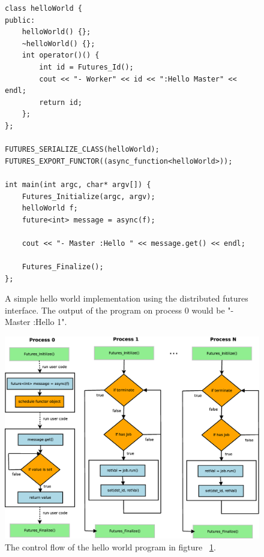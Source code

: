 \begin{figure}[here]
\begin{lstlisting}
class helloWorld {
public:
	helloWorld() {};
	~helloWorld() {};
	int operator()() { 
		int id = Futures_Id();
		cout << "- Worker" << id << ":Hello Master" << endl;
		return id;
	};
};

FUTURES_SERIALIZE_CLASS(helloWorld);
FUTURES_EXPORT_FUNCTOR((async_function<helloWorld>));

int main(int argc, char* argv[]) {
	Futures_Initialize(argc, argv);
	helloWorld f;
	future<int> message = async(f);

	cout << "- Master :Hello " << message.get() << endl;

	Futures_Finalize();
};
\end{lstlisting}
\caption{
A simple hello world implementation using the distributed futures interface.  
The output of the program on process 0 would be "- Master :Hello 1".}
\label{lst:hello}
\end{figure}

\begin{figure}[here]
\includegraphics[width=\columnwidth]{figures/hello_flow}
\caption{
The control flow of the hello world program in figture ~\ref{lst:hello}.}
\label{fig:helloCF}
\end{figure}

